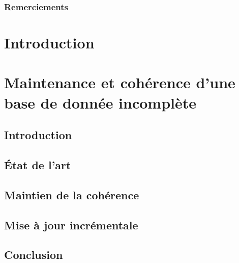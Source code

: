 
\pagestyle{fancy}


\frontmatter
\section*{Remerciements}
\lipsum[17-19]

\newpage

\tableofcontents
{}
\listoffigures
{}
\listoftables
\mainmatter

\part{Introduction}



\part{Maintenance et cohérence d'une base de donnée incomplète}

\chapter{Introduction}


\chapter{État de l'art}


\chapter{Maintien de la cohérence}


\chapter{Mise à jour incrémentale}


\chapter{Conclusion}


